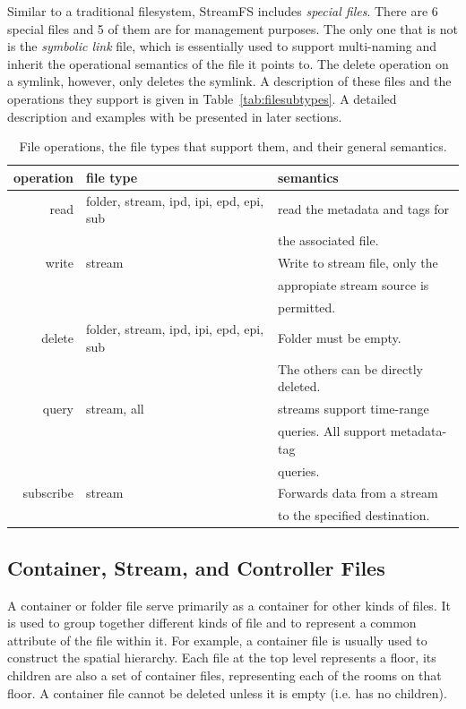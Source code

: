 Similar to a traditional filesystem, StreamFS includes \emph{special files}.  There are 6 special files and 5 of them 
are for management purposes.  The only one that is not is the \emph{symbolic link} file, which is essentially used to support
multi-naming and inherit the operational semantics of the file it points to.  The delete operation on a symlink, however,
only deletes the symlink.  A description of these files and the operations they support is given in Table~\ref{tab:filesubtypes}.
A detailed description and examples with be presented in later sections.


\begin{table}[h]
\begin{center}
\begin{tabular}{| r | l | l |}
	\hline
	\textbf{operation} & \textbf{file type} & \textbf{semantics} \\ \hline
	read & folder, stream, ipd, ipi, epd, epi, sub & read the metadata and tags for \\
		 &										   & the associated file. \\ \hline
	write &  stream & Write to stream file, only the \\ 
		  & 		& appropiate stream source is \\
		  &			& permitted.\\ \hline
	delete & folder, stream, ipd, ipi, epd, epi, sub & Folder must be empty.  \\
		   & 										 & The others can be directly deleted. \\ \hline
	query &  stream, all & streams support time-range   \\
		  &			     & queries. All support metadata-tag \\ 
		  &				 & queries. \\ \hline
	subscribe & stream & Forwards data from a stream \\
			  &		   & to the specified destination.\\
	\hline
\end{tabular}
\caption{File operations, the file types that support them, and their general semantics.}
\label{tab:semantics}
\end{center}
\end{table}

\subsection{Container, Stream, and Controller Files}
A container or folder file serve primarily as a container for other kinds of files.  It is used to group together different kinds of file and
to represent a common attribute of the file within it.  For example, a container file is usually used to construct the spatial hierarchy.
Each file at the top level represents a floor, its children are also a set of container files, representing each of the rooms on that floor.
A container file cannot be deleted unless it is empty (i.e. has no children).

